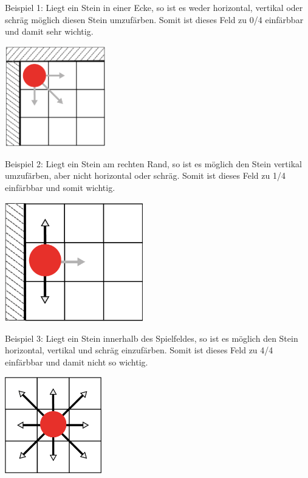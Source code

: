 \documentclass[12pt,a4paper,bibliography=totocnumbered,listof=totocnumbered]{scrartcl}
\begin{document}
    Beispiel 1: Liegt ein Stein in einer Ecke, so ist es weder horizontal, vertikal oder schräg möglich diesen Stein umzufärben. Somit ist dieses Feld zu 0/4 einfärbbar und damit sehr wichtig.

    \includegraphics[width=0.33\textwidth]{pics/Kapitel_3/Kapitel_3_pic1.png}

    Beispiel 2: Liegt ein Stein am rechten Rand, so ist es möglich den Stein vertikal umzufärben, aber nicht horizontal oder schräg. Somit ist dieses Feld zu 1/4 einfärbbar und somit wichtig.\newline

    \includegraphics[width=6cm]{pics/Kapitel_3/Kapitel_3_pic2.png}

    Beispiel 3: Liegt ein Stein innerhalb des Spielfeldes, so ist es möglich den Stein horizontal, vertikal und schräg einzufärben. Somit ist dieses Feld zu 4/4 einfärbbar und damit nicht so wichtig.\newline

    \includegraphics[width=4.2cm]{pics/Kapitel_3/Kapitel_3_pic3.png}
\end{document}
